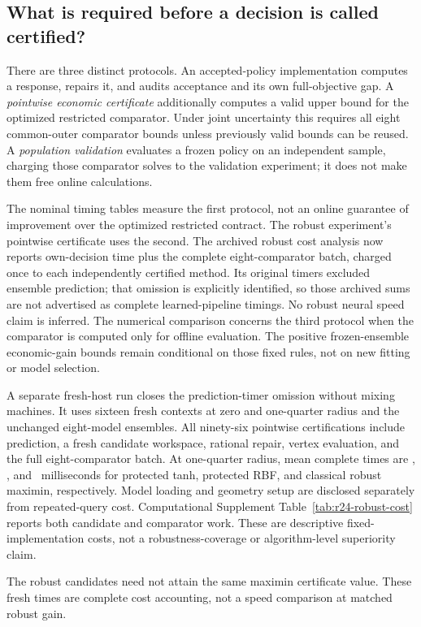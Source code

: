 \subsection{What is required before a decision is called certified?}
There are three distinct protocols. An accepted-policy implementation computes
a response, repairs it, and audits acceptance and its own full-objective gap.
A \emph{pointwise economic certificate} additionally computes a valid upper
bound for the optimized restricted comparator. Under joint uncertainty this
requires all eight common-outer comparator bounds unless previously valid
bounds can be reused. A \emph{population validation} evaluates a frozen policy
on an independent sample, charging those comparator solves to the validation
experiment; it does not make them free online calculations.

The nominal timing tables measure the first protocol, not an online guarantee
of improvement over the optimized restricted contract. The robust experiment's
pointwise certificate uses the second. The archived robust cost analysis now
reports own-decision time plus the complete eight-comparator batch, charged
once to each independently certified method. Its original timers excluded
ensemble prediction; that omission is explicitly identified, so those archived
sums are not advertised as complete learned-pipeline timings. No robust neural
speed claim is inferred. The numerical comparison concerns the third protocol
when the comparator is computed only for offline evaluation. The positive
frozen-ensemble economic-gain bounds remain conditional on those fixed rules,
not on new fitting or model selection.


A separate fresh-host run closes the prediction-timer omission without mixing
machines. It uses sixteen fresh contexts at zero and one-quarter radius and
the unchanged eight-model ensembles. All ninety-six pointwise certifications
include prediction, a fresh candidate workspace, rational repair, vertex
evaluation, and the full eight-comparator batch. At one-quarter radius, mean
complete times are \RTwentyFourRobustTanh, \RTwentyFourRobustRBF, and
\RTwentyFourRobustClassical\ milliseconds for protected tanh, protected RBF,
and classical robust maximin, respectively. Model loading and geometry setup
are disclosed separately from repeated-query cost. Computational Supplement
Table~\ref{tab:r24-robust-cost} reports both candidate and comparator work.
These are descriptive fixed-implementation costs, not a robustness-coverage
or algorithm-level superiority claim.

The robust candidates need not attain the same maximin certificate value. These fresh times are complete cost accounting, not a speed comparison at matched robust gain.
